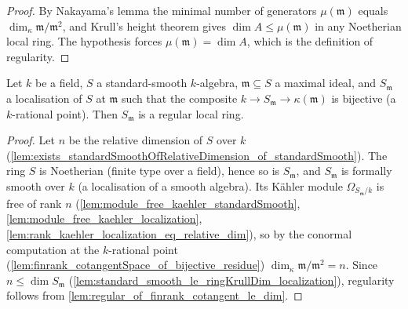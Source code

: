 \begin{proof}
  By Nakayama's lemma the minimal number of generators \(\mu(\mathfrak m)\)
  equals \(\dim_\kappa \mathfrak m/\mathfrak m^2\), and Krull's height theorem
  gives \(\dim A \le \mu(\mathfrak m)\) in any Noetherian local ring. The
  hypothesis forces \(\mu(\mathfrak m) = \dim A\), which is the definition of
  regularity.
\end{proof}

\begin{lemma}
  \label{lem:standard_smooth_regular_at_rational_point}
  Let \(k\) be a field, \(S\) a standard-smooth \(k\)-algebra,
  \(\mathfrak m \subseteq S\) a maximal ideal, and \(S_{\mathfrak m}\) a
  localisation of \(S\) at \(\mathfrak m\) such that the composite
  \(k \to S_{\mathfrak m} \to \kappa(\mathfrak m)\) is bijective (a
  \(k\)-rational point). Then \(S_{\mathfrak m}\) is a regular local ring.
\end{lemma}

\begin{proof}
  Let \(n\) be the relative dimension of \(S\) over \(k\)
  (\cref{lem:exists_standardSmoothOfRelativeDimension_of_standardSmooth}).
  The ring \(S\) is Noetherian (finite type over a field), hence so is
  \(S_{\mathfrak m}\), and \(S_{\mathfrak m}\) is formally smooth over \(k\)
  (a localisation of a smooth algebra). Its K\"ahler module
  \(\Omega_{S_{\mathfrak m}/k}\) is free of rank \(n\)
  (\cref{lem:module_free_kaehler_standardSmooth},
  \cref{lem:module_free_kaehler_localization},
  \cref{lem:rank_kaehler_localization_eq_relative_dim}), so by the conormal
  computation at the \(k\)-rational point
  (\cref{lem:finrank_cotangentSpace_of_bijective_residue})
  \(\dim_{\kappa} \mathfrak m/\mathfrak m^2 = n\). Since
  \(n \le \dim S_{\mathfrak m}\)
  (\cref{lem:standard_smooth_le_ringKrullDim_localization}), regularity
  follows from \cref{lem:regular_of_finrank_cotangent_le_dim}.
\end{proof}

